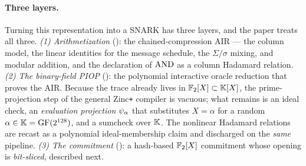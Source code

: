 \paragraph{Three layers.} Turning this representation into a SNARK has three
layers, and the paper treats all three.
\emph{(1) Arithmetization} (): the chained-compression AIR ---
the column model, the linear identities for the message schedule, the
$\Sigma/\sigma$ mixing, and modular addition, and the declaration of $\operatorname{AND}$ as
a column Hadamard relation.
\emph{(2) The binary-field PIOP} (): the polynomial
interactive oracle reduction that proves the AIR. Because the trace already
lives in $\mathbb{F}_2[X]\subset\mathbb{K}[X]$, the prime-projection step of the general
Zinc\texttt{+} compiler is vacuous; what remains is an ideal check, an
\emph{evaluation projection} $\psi_{\alpha}$ that substitutes $X = \alpha$ for a random
$\alpha\in\mathbb{K} = \mathrm{GF}(2^{128})$, and a sumcheck over $\mathbb{K}$. The nonlinear
Hadamard relations are recast as a polynomial ideal-membership claim and
discharged on the \emph{same} pipeline.
\emph{(3) The commitment} (): a hash-based $\mathbb{F}_2[X]$
commitment whose opening is \emph{bit-sliced}, described next.

